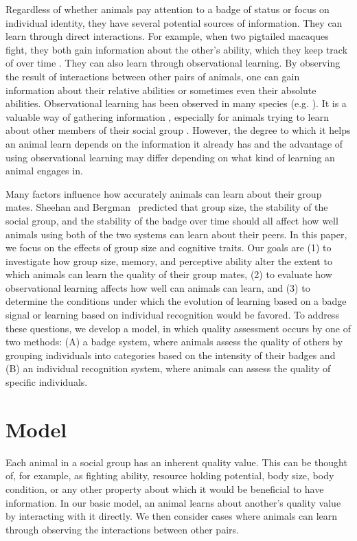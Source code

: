 Regardless of whether animals pay attention to a badge of status or focus on individual identity, they have several potential sources of information. They can learn through direct interactions. For example, when two pigtailed macaques fight, they both gain information about the other's ability, which they keep track of over time \citep{Flack:2006uq}. They can also learn through observational learning. By observing the result of interactions between other pairs of animals, one can gain information about their relative abilities or sometimes even their absolute abilities. Observational learning has been observed in many species (e.g. \citep{Gaudet:1984cr,Holekamp:1991nx,Fiorito:1992ve,Marchetti:2000dq,Bugnyar:2002qf,Hopper:2008bh,Hobson:2015uq}). It is a valuable way of gathering information \citep{Holekamp:1991nx,Schaik:2011oq,Seyfarth2015SocialCognition}, especially for animals trying to learn about other members of their social group \citep{Freeman:1985kl,Holekamp:1991nx,Hobson:2015uq}. However, the degree to which it helps an animal learn depends on the information it already has and the advantage of using observational learning may differ depending on what kind of learning an animal engages in.


Many factors influence how accurately animals can learn about their group mates. Sheehan and Bergman~\citep{sheehan2016evotradeoff} predicted that group size, the stability of the social group, and the stability of the badge over time should all affect how well animals using both of the two systems can learn about their peers. In this paper, we focus on the effects of group size and cognitive traits. Our goals are (1) to investigate how group size, memory, and perceptive ability alter the extent to which animals can learn the quality of their group mates, (2) to evaluate how observational learning affects how well can animals can learn, and (3) to determine the conditions under which the evolution of learning based on a badge signal or learning based on individual recognition would be favored. To address these questions, we develop a model, in which quality assessment occurs by one of two methods: (A) a badge system, where animals assess the quality of others by grouping individuals into categories based on the intensity of their badges and (B) an individual recognition system, where animals can assess the quality of specific individuals.  


\section*{Model} 
Each animal in a social group has an inherent quality value. This can be thought of, for example, as fighting ability, resource holding potential, body size, body condition, or any other property about which it would be beneficial to have information. In our basic model, an animal learns about another's quality value by interacting with it directly. We then consider cases where animals can learn through observing the interactions between other pairs. 

